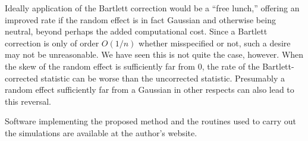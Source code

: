 \documentclass[12pt]{article}
\begin{document}
Ideally application of the Bartlett correction would be a ``free
lunch,'' offering an improved rate if the random effect is in fact Gaussian and otherwise being neutral, beyond perhaps the added computational cost. Since a Bartlett correction is only of order $O(1/n)$ whether misspecified or not, such a desire may not be unreasonable. %
We have seen this is not quite the case, however. When the skew of the random
effect is sufficiently far from $0$, the rate of the
Bartlett-corrected statistic can be worse than the uncorrected
statistic. Presumably a random effect sufficiently far from a Gaussian
in other respects can also lead to this reversal.



Software implementing the proposed method and the routines used to carry out the simulations are available at the author's website.





\appendix


\end{document}
